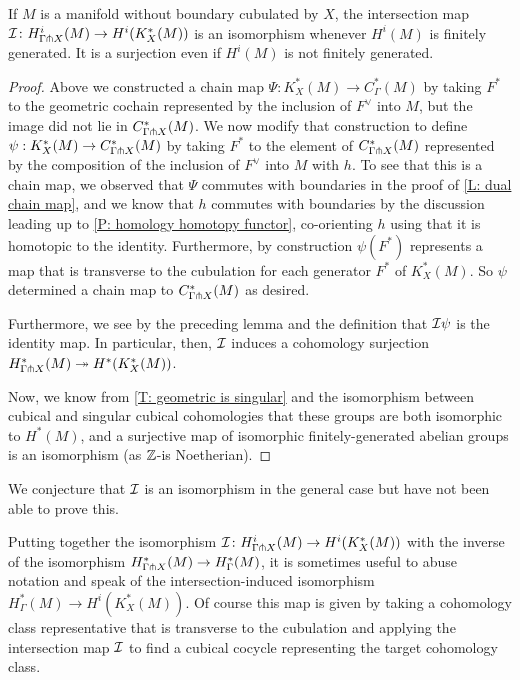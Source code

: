 \begin{theorem}\label{T: intersection qi}
	If $M$ is a manifold without boundary cubulated by $X$, the intersection map $\mathcal{I} \colon H^i_{\Gamma \pitchfork X}(M) \to H^i(K_X^*(M))$ is an isomorphism whenever $H^i(M)$ is finitely generated.
	It is a surjection even if $H^i(M)$ is not finitely generated.
\end{theorem}

\begin{proof}
	Above we constructed a chain map $\Psi \colon K_X^*(M) \to C_\Gamma^*(M)$ by taking $F^*$ to the geometric cochain represented by the inclusion of $F^\vee$ into $M$, but the image did not lie in $C^*_{\Gamma \pitchfork X}(M)$.
	We now modify that construction to define $\psi:K_X^*(M) \to C_{\Gamma \pitchfork X}^*(M)$ by taking $F^*$ to the element of $C^*_{\Gamma \pitchfork X}(M)$ represented by the composition of the inclusion of $F^\vee$ into $M$ with $h$.
	To see that this is a chain map, we observed that $\Psi$ commutes with boundaries in the proof of \cref{L: dual chain map}, and we know that $h$ commutes with boundaries by the discussion leading up to \cref{P: homology homotopy functor}, co-orienting $h$ using that it is homotopic to the identity.
	Furthermore, by construction $\psi(F^*)$ represents a map that is transverse to the cubulation for each generator $F^*$ of $K_X^*(M)$.
	So $\psi$ determined a chain map to $C_{\Gamma \pitchfork X}^*(M)$ as desired.

	Furthermore, we see by the preceding lemma and the definition that $\mathcal{I}\psi$ is the identity map.
	In particular, then, $\mathcal{I}$ induces a cohomology surjection $H^*_{\Gamma \pitchfork X}(M)\twoheadrightarrow H^*(K_X^*(M))$.

	Now, we know from \cref{T: geometric is singular} and the isomorphism between cubical and singular cubical cohomologies that these groups are both isomorphic to $H^*(M)$, and a surjective map of isomorphic finitely-generated abelian groups is an isomorphism (as $\mathbb{Z}$-is Noetherian).
\end{proof}

We conjecture that $\mathcal{I}$ is an isomorphism in the general case but have not been able to prove this.

\begin{remark}\label{R: intersection map extension}
	Putting together the isomorphism $\mathcal{I} \colon H^i_{\Gamma \pitchfork X}(M) \to H^i(K_X^*(M))$ with the inverse of the isomorphism $H^*_{\Gamma \pitchfork X}(M) \to H^*_\Gamma(M)$, it is sometimes useful to abuse notation and speak of the intersection-induced isomorphism
	$H^*_\Gamma(M) \to H^i(K_X^*(M))$.
	Of course this map is given by taking a cohomology class representative that is transverse to the cubulation and applying the intersection map $\mathcal{I}$ to find a cubical cocycle representing the target cohomology class.
\end{remark}